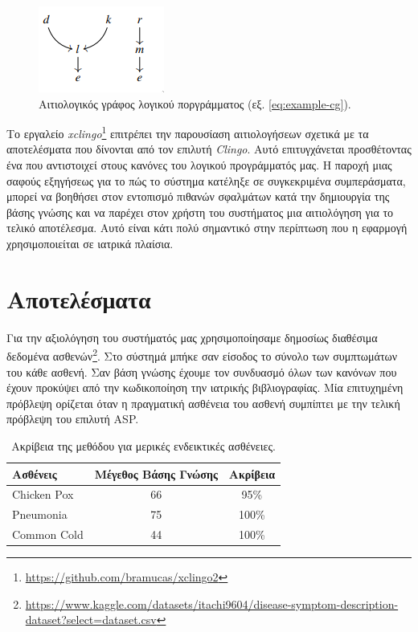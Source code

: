 \documentclass[10pt,leqno]{amsart}
\begin{document}
\begin{figure}
    \centering
    \includegraphics{assets/causal_g.png}
    \caption{Αιτιολογικός γράφος λογικού ποργράμματος (εξ. \ref{eq:example-cg}).}
    \label{fig:causal-g}
\end{figure}



Το εργαλείο \textit{xclingo}\footnote{\url{https://github.com/bramucas/xclingo2}} \cite{Cabalar_2020} επιτρέπει την παρουσίαση αιτιολογήσεων σχετικά με τα αποτελέσματα που δίνονται από τον επιλυτή \textit{Clingo}.
Αυτό επιτυγχάνεται προσθέτοντας ένα  που αντιστοιχεί στους κανόνες του λογικού προγράμματός μας.
Η παροχή μιας σαφούς εξηγήσεως για το πώς το σύστημα κατέληξε σε συγκεκριμένα συμπεράσματα, μπορεί να βοηθήσει στον εντοπισμό πιθανών σφαλμάτων κατά την δημιουργία της βάσης γνώσης και να παρέχει στον χρήστη του συστήματος μια αιτιολόγηση για το τελικό αποτέλεσμα. Αυτό είναι κάτι πολύ σημαντικό στην περίπτωση που η εφαρμογή χρησιμοποιείται σε ιατρικά πλαίσια.

\section{Αποτελέσματα}

Για την αξιολόγηση του συστήματός μας χρησιμοποίησαμε δημοσίως διαθέσιμα δεδομένα ασθενών\footnote{\url{https://www.kaggle.com/datasets/itachi9604/disease-symptom-description-dataset?select=dataset.csv}}.
Στο σύστημά μπήκε σαν είσοδος το σύνολο των συμπτωμάτων του κάθε ασθενή.
Σαν βάση γνώσης έχουμε τον συνδυασμό όλων των κανόνων που έχουν προκύψει από την κωδικοποίηση την ιατρικής βιβλιογραφίας.  
Μία επιτυχημένη πρόβλεψη ορίζεται όταν η πραγματική ασθένεια του ασθενή συμπίπτει με την τελική
πρόβλεψη του επιλυτή ASP.

\begin{table}[h]
    \centering
    \begin{tabular}{lcc}
    \hline
    Ασθένεις & Μέγεθος Βάσης Γνώσης & Ακρίβεια \\
    \hline
    \hline
    Chicken Pox      &  66  & 95\% \\
    Pneumonia        &  75  & 100\% \\
    Common Cold    &   44 & 100\% \\
    \hline
    \end{tabular}
    \caption{Ακρίβεια της μεθόδου για μερικές ενδεικτικές ασθένειες.}
\end{table}
\end{document}
